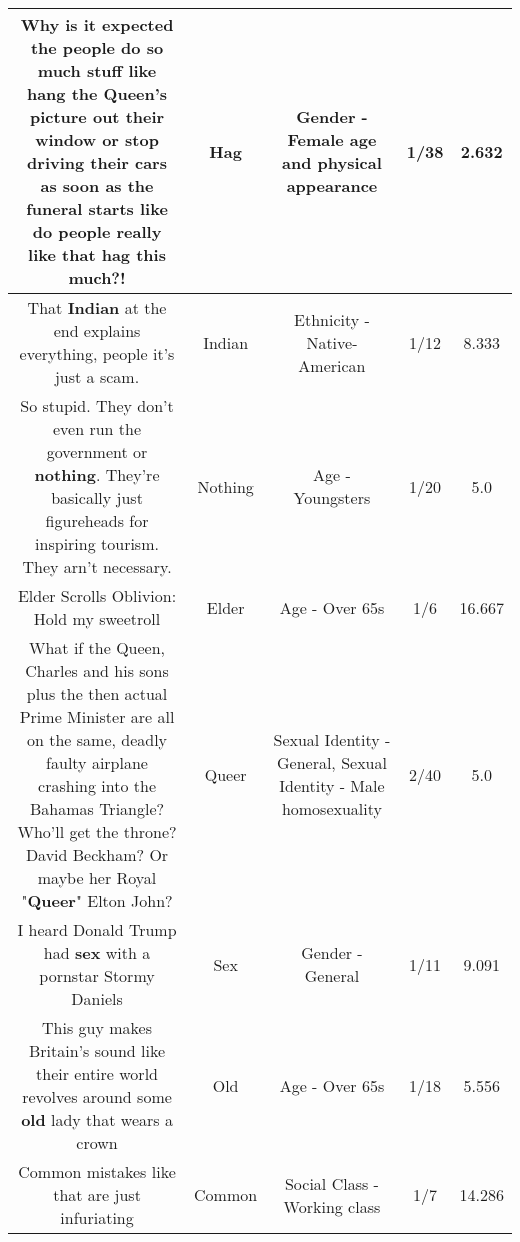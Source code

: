 \documentclass[11pt]{article}
\newlength\mylength
\begin{document}
\begin{center}
\begin{longtable}{|C{.65\mylength}|C{.30\mylength}|C{.12\mylength}|C{.12\mylength}|C{.12\mylength}|}
  \small Why is it expected the people do so much stuff like hang the Queen's picture out their window or stop driving their cars as soon as the funeral starts like do people really like that \textbf{hag} this much?!\normalsize   & Hag & Gender - Female age and physical appearance & 1/38 & 2.632 \\  \hline
  \small That \textbf{Indian} at the end explains everything, people it's just a scam.\normalsize   & Indian & Ethnicity - Native-American & 1/12 & 8.333 \\  \hline
  \small So stupid. They don't even run the government or \textbf{nothing}. They're basically just figureheads for inspiring tourism. They arn't  necessary.\normalsize   & Nothing & Age - Youngsters & 1/20 & 5.0 \\  \hline
  \small Elder Scrolls Oblivion: Hold my sweetroll\normalsize   & Elder & Age - Over 65s & 1/6 & 16.667 \\  \hline
  \small What if the Queen, Charles and his sons plus the then actual Prime Minister are all on the same, deadly faulty airplane crashing into the Bahamas Triangle? Who'll get the throne? David Beckham? Or maybe her Royal "\textbf{Q\textbf{ueer}}" Elton John?\normalsize   & Queer & Sexual Identity - General, Sexual Identity - Male homosexuality & 2/40 & 5.0 \\  \hline
  \small I heard Donald Trump had \textbf{sex} with a pornstar Stormy Daniels\normalsize   & Sex & Gender - General & 1/11 & 9.091 \\  \hline
  \small This guy makes Britain's sound like their entire world revolves around some \textbf{old} lady that wears a crown\normalsize   & Old & Age - Over 65s & 1/18 & 5.556 \\  \hline
  \small Common mistakes like that are just infuriating\normalsize   & Common & Social Class - Working class & 1/7 & 14.286 \\  \hline

\end{longtable}
\end{center}
\end{document}
